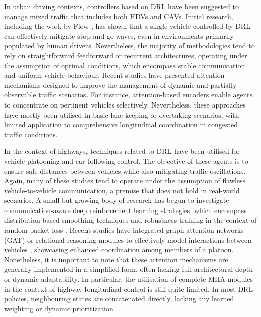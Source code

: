 \documentclass{ieeeaccess}
\begin{document}
 In urban driving contexts, controllers based on DRL have been suggested to manage mixed traffic that includes both HDVs and CAVs.  Initial research, including the work by Flow \cite{wu2017flow}, has shown that a single vehicle controlled by DRL can effectively mitigate stop-and-go waves, even in environments primarily populated by human drivers.  Nevertheless, the majority of methodologies tend to rely on straightforward feedforward or recurrent architectures, operating under the assumption of optimal conditions, which encompass stable communication and uniform vehicle behaviour.  Recent studies have presented attention mechanisms designed to improve the management of dynamic and partially observable traffic scenarios. For instance, attention-based encoders \cite{Oroojlooy2020_AttendLight} enable agents to concentrate on pertinent vehicles selectively.  Nevertheless, these approaches have mostly been utilised in basic lane-keeping or overtaking scenarios, with limited application to comprehensive longitudinal coordination in congested traffic conditions.

 In the context of highways, techniques related to DRL have been utilised for vehicle platooning and car-following control. The objective of these agents is to ensure safe distances between vehicles while also mitigating traffic oscillations. Again, many of these studies tend to operate under the assumption of flawless vehicle-to-vehicle communication, a premise that does not hold in real-world scenarios.  A small but growing body of research has begun to investigate communication-aware deep reinforcement learning strategies, which encompass distribution-based smoothing techniques and robustness training in the context of random packet loss \cite{shi2022deep,cai2024multi}.  Recent studies have integrated graph attention networks (GAT) or relational reasoning modules to effectively model interactions between vehicles \cite{guo2024attention}, showcasing enhanced coordination among members of a platoon. Nonetheless, it is important to note that these attention mechanisms are generally implemented in a simplified form, often lacking full architectural depth or dynamic adaptability.  In particular, the utilisation of complete MHA modules in the context of highway longitudinal control is still quite limited.  In most DRL policies, neighbouring states are concatenated directly, lacking any learned weighting or dynamic prioritization.
\end{document}
